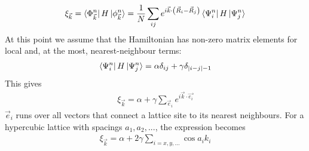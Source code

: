 \documentclass{article}
\begin{document}
\begin{equation}\begin{aligned}
	\xi_{\vec k} = \bra{\Phi^n_{\vec k}}H\ket{\phi^n_{\vec k}} = \frac{1}{N}\sum_{ij}e^{i \vec k \cdot\left(\vec R_i - \vec R_j\right)}\bra{\Psi^n_i}H\ket{\Psi^n_j}
\end{aligned}\end{equation}
At this point we assume that the Hamiltonian has non-zero matrix elements for local and, at the most, nearest-neighbour terms:
\begin{equation}\begin{aligned}
	\bra{\Psi^n_i}H\ket{\Psi^n_j} = \alpha \delta_{ij} + \gamma \delta_{|i-j| - 1}
\end{aligned}\end{equation}
This gives
\begin{equation}\begin{aligned}
	\xi_{\vec k} = \alpha + \gamma\sum_{\vec e_i}e^{i \vec{ k}\cdot\vec{ e_i}}
\end{aligned}\end{equation}
\(\vec e_i\) runs over all vectors that connect a lattice site to its nearest neighbours. For a hypercubic lattice with spacings \(a_1, a_2, ...\), the expression becomes
\begin{equation}\begin{aligned}
	\xi_{\vec k} = \alpha + 2\gamma\sum_{i=x,y,...}\cos a_i k_i
\end{aligned}\end{equation}
\end{document}
